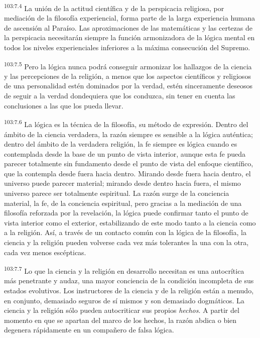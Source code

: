 \documentclass[twoside, 11pt]{book}
\begin{document}
\par
\textsuperscript{103:7.4} La unión de la actitud científica y de la perspicacia religiosa, por mediación de la filosofía experiencial, forma parte de la larga experiencia humana de ascensión al Paraíso. Las aproximaciones de las matemáticas y las certezas de la perspicacia necesitarán siempre la función armonizadora de la lógica mental en todos los niveles experienciales inferiores a la máxima consecución del Supremo.

\par
\textsuperscript{103:7.5} Pero la lógica nunca podrá conseguir armonizar los hallazgos de la ciencia y las percepciones de la religión, a menos que los aspectos científicos y religiosos de una personalidad estén dominados por la verdad, estén sinceramente deseosos de seguir a la verdad dondequiera que los conduzca, sin tener en cuenta las conclusiones a las que los pueda llevar.

\par
\textsuperscript{103:7.6} La lógica es la técnica de la filosofía, su método de expresión. Dentro del ámbito de la ciencia verdadera, la razón siempre es sensible a la lógica auténtica; dentro del ámbito de la verdadera religión, la fe siempre es lógica cuando es contemplada desde la base de un punto de vista interior, aunque esta fe pueda parecer totalmente sin fundamento desde el punto de vista del enfoque científico, que la contempla desde fuera hacia dentro. Mirando desde fuera hacia dentro, el universo puede parecer material; mirando desde dentro hacia fuera, el mismo universo parece ser totalmente espiritual. La razón surge de la conciencia material, la fe, de la conciencia espiritual, pero gracias a la mediación de una filosofía reforzada por la revelación, la lógica puede confirmar tanto el punto de vista interior como el exterior, estabilizando de este modo tanto a la ciencia como a la religión. Así, a través de un contacto común con la lógica de la filosofía, la ciencia y la religión pueden volverse cada vez más tolerantes la una con la otra, cada vez menos escépticas.

\par
\textsuperscript{103:7.7} Lo que la ciencia y la religión en desarrollo necesitan es una autocrítica más penetrante y audaz, una mayor conciencia de la condición incompleta de sus estados evolutivos. Los instructores de la ciencia y de la religión están a menudo, en conjunto, demasiado seguros de sí mismos y son demasiado dogmáticos. La ciencia y la religión sólo pueden autocriticar sus propios \textit{hechos}. A partir del momento en que se apartan del marco de los hechos, la razón abdica o bien degenera rápidamente en un compañero de falsa lógica.
\end{document}
